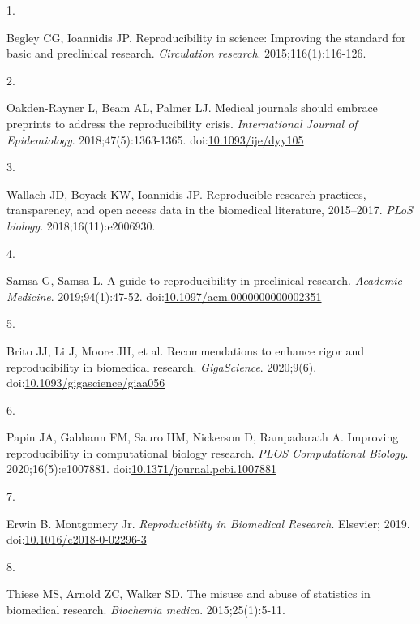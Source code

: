 \documentclass[smallextended]{svjour3}       %
\newlength{\cslhangindent}
\newlength{\csllabelwidth}
\newlength{\cslentryspacingunit} %
\newenvironment{CSLReferences}[2] %
 {%
  \setlength{\parindent}{0pt}
  \ifodd #1
  \let\oldpar\par
  \def\par{\hangindent=\cslhangindent\oldpar}
  \fi
  \setlength{\parskip}{#2\cslentryspacingunit}
 }%
 {}
\newcommand{\CSLLeftMargin}[1]{\parbox[t]{\csllabelwidth}{#1}}
\newcommand{\CSLRightInline}[1]{\parbox[t]{\linewidth - \csllabelwidth}{#1}\break}
\begin{document}
\hypertarget{refs}{}
\begin{CSLReferences}{0}{0}
\leavevmode{}%
\CSLLeftMargin{1. }%
\CSLRightInline{Begley CG, Ioannidis JP. Reproducibility in science:
Improving the standard for basic and preclinical research.
\emph{Circulation research}. 2015;116(1):116-126.}

\leavevmode{}%
\CSLLeftMargin{2. }%
\CSLRightInline{Oakden-Rayner L, Beam AL, Palmer LJ. Medical journals
should embrace preprints to address the reproducibility crisis.
\emph{International Journal of Epidemiology}. 2018;47(5):1363-1365.
doi:\href{https://doi.org/10.1093/ije/dyy105}{10.1093/ije/dyy105}}

\leavevmode{}%
\CSLLeftMargin{3. }%
\CSLRightInline{Wallach JD, Boyack KW, Ioannidis JP. Reproducible
research practices, transparency, and open access data in the biomedical
literature, 2015--2017. \emph{PLoS biology}. 2018;16(11):e2006930.}

\leavevmode{}%
\CSLLeftMargin{4. }%
\CSLRightInline{Samsa G, Samsa L. A guide to reproducibility in
preclinical research. \emph{Academic Medicine}. 2019;94(1):47-52.
doi:\href{https://doi.org/10.1097/acm.0000000000002351}{10.1097/acm.0000000000002351}}

\leavevmode{}%
\CSLLeftMargin{5. }%
\CSLRightInline{Brito JJ, Li J, Moore JH, et al. {Recommendations to
enhance rigor and reproducibility in biomedical research}.
\emph{GigaScience}. 2020;9(6).
doi:\href{https://doi.org/10.1093/gigascience/giaa056}{10.1093/gigascience/giaa056}}

\leavevmode{}%
\CSLLeftMargin{6. }%
\CSLRightInline{Papin JA, Gabhann FM, Sauro HM, Nickerson D, Rampadarath
A. Improving reproducibility in computational biology research.
\emph{{PLOS} Computational Biology}. 2020;16(5):e1007881.
doi:\href{https://doi.org/10.1371/journal.pcbi.1007881}{10.1371/journal.pcbi.1007881}}

\leavevmode{}%
\CSLLeftMargin{7. }%
\CSLRightInline{Erwin B. Montgomery Jr. \emph{Reproducibility in
Biomedical Research}. Elsevier; 2019.
doi:\href{https://doi.org/10.1016/c2018-0-02296-3}{10.1016/c2018-0-02296-3}}

\leavevmode{}%
\CSLLeftMargin{8. }%
\CSLRightInline{Thiese MS, Arnold ZC, Walker SD. The misuse and abuse of
statistics in biomedical research. \emph{Biochemia medica}.
2015;25(1):5-11.}


\end{CSLReferences}
\end{document}
